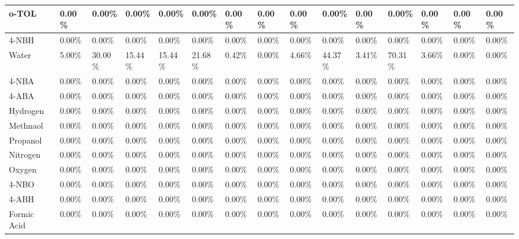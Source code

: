\begin{landscape}
\begin{table}[H]
\begin{tabular}{|l|l|l|l|l|l|l|l|l|l|l|l|l|l|l|}
o-TOL                   & 0.00\%  & 0.00\%  & 0.00\%  & 0.00\%  & 0.00\%  & 0.00\%  & 0.00\%  & 0.00\%  & 0.00\%  & 0.00\%  & 0.00\%  & 0.00\%  & 0.00\%  & 0.00\%   \\ \hline
4-NBH                   & 0.00\%  & 0.00\%  & 0.00\%  & 0.00\%  & 0.00\%  & 0.00\%  & 0.00\%  & 0.00\%  & 0.00\%  & 0.00\%  & 0.00\%  & 0.00\%  & 0.00\%  & 0.00\%   \\ \hline
Water                   & 5.00\%  & 30.00\% & 15.44\% & 15.44\% & 21.68\% & 0.42\%  & 0.00\%  & 4.66\%  & 44.37\% & 3.41\%  & 70.31\% & 3.66\%  & 0.00\%  & 0.00\%   \\ \hline
4-NBA                   & 0.00\%  & 0.00\%  & 0.00\%  & 0.00\%  & 0.00\%  & 0.00\%  & 0.00\%  & 0.00\%  & 0.00\%  & 0.00\%  & 0.00\%  & 0.00\%  & 0.00\%  & 0.00\%   \\ \hline
4-ABA                   & 0.00\%  & 0.00\%  & 0.00\%  & 0.00\%  & 0.00\%  & 0.00\%  & 0.00\%  & 0.00\%  & 0.00\%  & 0.00\%  & 0.00\%  & 0.00\%  & 0.00\%  & 0.00\%   \\ \hline
Hydrogen                & 0.00\%  & 0.00\%  & 0.00\%  & 0.00\%  & 0.00\%  & 0.00\%  & 0.00\%  & 0.00\%  & 0.00\%  & 0.00\%  & 0.00\%  & 0.00\%  & 0.00\%  & 0.00\%   \\ \hline
Methnaol                & 0.00\%  & 0.00\%  & 0.00\%  & 0.00\%  & 0.00\%  & 0.00\%  & 0.00\%  & 0.00\%  & 0.00\%  & 0.00\%  & 0.00\%  & 0.00\%  & 0.00\%  & 0.00\%   \\ \hline
Propanol                & 0.00\%  & 0.00\%  & 0.00\%  & 0.00\%  & 0.00\%  & 0.00\%  & 0.00\%  & 0.00\%  & 0.00\%  & 0.00\%  & 0.00\%  & 0.00\%  & 0.00\%  & 0.00\%   \\ \hline
Nitrogen                & 0.00\%  & 0.00\%  & 0.00\%  & 0.00\%  & 0.00\%  & 0.00\%  & 0.00\%  & 0.00\%  & 0.00\%  & 0.00\%  & 0.00\%  & 0.00\%  & 0.00\%  & 0.00\%   \\ \hline
Oxygen                  & 0.00\%  & 0.00\%  & 0.00\%  & 0.00\%  & 0.00\%  & 0.00\%  & 0.00\%  & 0.00\%  & 0.00\%  & 0.00\%  & 0.00\%  & 0.00\%  & 0.00\%  & 0.00\%   \\ \hline
4-NBO                   & 0.00\%  & 0.00\%  & 0.00\%  & 0.00\%  & 0.00\%  & 0.00\%  & 0.00\%  & 0.00\%  & 0.00\%  & 0.00\%  & 0.00\%  & 0.00\%  & 0.00\%  & 0.00\%   \\ \hline
4-ABH                   & 0.00\%  & 0.00\%  & 0.00\%  & 0.00\%  & 0.00\%  & 0.00\%  & 0.00\%  & 0.00\%  & 0.00\%  & 0.00\%  & 0.00\%  & 0.00\%  & 0.00\%  & 0.00\%   \\ \hline
Formic Acid             & 0.00\%  & 0.00\%  & 0.00\%  & 0.00\%  & 0.00\%  & 0.00\%  & 0.00\%  & 0.00\%  & 0.00\%  & 0.00\%  & 0.00\%  & 0.00\%  & 0.00\%  & 0.00\%   \\ \hline

\end{tabular}
\end{table}
\end{landscape}
